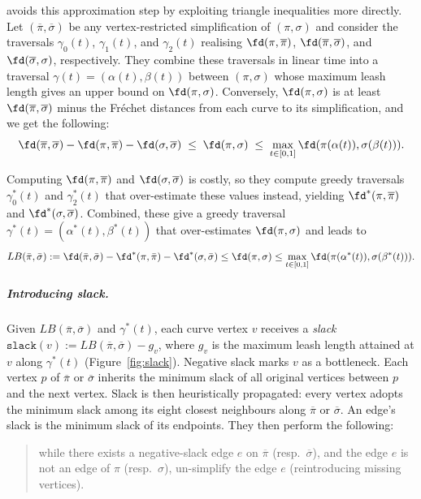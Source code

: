\cite{harpeled_et_al:LIPIcs.SoCG.2025.54} avoids this approximation step by exploiting triangle inequalities more directly. 
Let $(\overline{\pi},\overline{\sigma})$ be any vertex-restricted simplification of $(\pi,\sigma)$ and consider the traversals $\gamma_0(t)$, $\gamma_1(t)$, and $\gamma_2(t)$ realising $\fd(\pi,\overline{\pi})$, $\fd(\overline{\pi},\overline{\sigma})$, and $\fd(\overline{\sigma},\sigma)$, respectively. 
They combine these traversals in linear time into a traversal $\gamma(t)=(\alpha(t),\beta(t))$ between $(\pi,\sigma)$ whose maximum leash length gives an upper bound on $\fd(\pi,\sigma)$. 
Conversely, $\fd(\pi,\sigma)$ is at least $\fd(\overline{\pi},\overline{\sigma})$ minus the Fréchet distances from each curve to its simplification, and we get the following:
\[
\fd(\overline{\pi},\overline{\sigma}) - \fd(\pi,\overline{\pi}) - \fd(\sigma,\overline{\sigma})
\;\leq\; \fd(\pi,\sigma)
\;\leq\;
\max_{t\in[0,1]} \fd(\pi(\alpha(t)),\sigma(\beta(t))).
\]

Computing $\fd(\pi,\overline{\pi})$ and $\fd(\sigma,\overline{\sigma})$ is costly, so they compute greedy traversals $\gamma_0^*(t)$ and $\gamma_2^*(t)$ that over-estimate these values instead, yielding $\fd^*(\pi,\overline{\pi})$ and $\fd^*(\sigma,\overline{\sigma})$. 
Combined, these give a greedy traversal $\gamma^*(t)=(\alpha^*(t),\beta^*(t))$ that over-estimates $\fd(\pi,\sigma)$ and leads to
\begin{equation}
\label{eq:inequality}
LB(\bar\pi,\bar\sigma)
:=\fd(\bar\pi,\bar\sigma)-\fd^*(\pi,\bar\pi)-\fd^*(\sigma,\bar\sigma)
\le \fd(\pi,\sigma)
\le \max_{t\in[0,1]}\fd(\pi(\alpha^*(t)),\sigma(\beta^*(t))).
\end{equation}

\subparagraph{Introducing slack.}
Given $LB(\overline{\pi},\overline{\sigma})$ and $\gamma^*(t)$, each curve vertex $v$ receives a \emph{slack} $
\texttt{slack}(v) := LB(\overline{\pi},\overline{\sigma}) - g_v$,
where $g_v$ is the maximum leash length attained at $v$ along $\gamma^*(t)$ (Figure~\ref{fig:slack}).  
Negative slack marks $v$ as a bottleneck.  
Each vertex $p$ of $\overline{\pi}$ or $\overline{\sigma}$ inherits the minimum slack of all original vertices between $p$ and the next vertex.  
Slack is then heuristically propagated: every vertex adopts the minimum slack among its eight closest neighbours along $\overline{\pi}$ or $\overline{\sigma}$. 
An edge’s slack is the minimum slack of its endpoints.  
They then perform the following:

\begin{quote}
    while there exists a negative-slack edge $e$ on $\overline{\pi}$ (resp.\ $\overline{\sigma}$), and the edge $e$ is not an edge of $\pi$ (resp.\ $\sigma$), un-simplify the edge $e$ (reintroducing missing vertices).
\end{quote}


